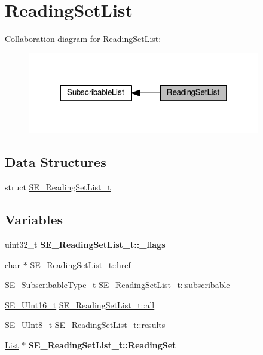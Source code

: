 \hypertarget{group__ReadingSetList}{}\section{Reading\+Set\+List}
\label{group__ReadingSetList}
Collaboration diagram for Reading\+Set\+List\+:\nopagebreak
\begin{figure}[H]
\begin{center}
\leavevmode
\includegraphics[width=288pt]{group__ReadingSetList}
\end{center}
\end{figure}
\subsection*{Data Structures}
\begin{DoxyCompactItemize}
\item 
struct \hyperlink{structSE__ReadingSetList__t}{S\+E\+\_\+\+Reading\+Set\+List\+\_\+t}
\end{DoxyCompactItemize}
\subsection*{Variables}
\begin{DoxyCompactItemize}
\item 
\mbox{\label{group__ReadingSetList_ga70e20e04ac9f65195d9b34a07f8bd1ed}} 
uint32\+\_\+t {\bfseries S\+E\+\_\+\+Reading\+Set\+List\+\_\+t\+::\+\_\+flags}
\item 
char $\ast$ \hyperlink{group__ReadingSetList_ga0070650a5263a076d3ce35b922fc53ea}{S\+E\+\_\+\+Reading\+Set\+List\+\_\+t\+::href}
\item 
\hyperlink{group__SubscribableType_ga5c41f553d369710ed34619266bf2551e}{S\+E\+\_\+\+Subscribable\+Type\+\_\+t} \hyperlink{group__ReadingSetList_ga95a98662b6838987c7eece397b81f7d2}{S\+E\+\_\+\+Reading\+Set\+List\+\_\+t\+::subscribable}
\item 
\hyperlink{group__UInt16_gac68d541f189538bfd30cfaa712d20d29}{S\+E\+\_\+\+U\+Int16\+\_\+t} \hyperlink{group__ReadingSetList_ga1994d11924fcf8fc6a97155fa178c76f}{S\+E\+\_\+\+Reading\+Set\+List\+\_\+t\+::all}
\item 
\hyperlink{group__UInt8_gaf7c365a1acfe204e3a67c16ed44572f5}{S\+E\+\_\+\+U\+Int8\+\_\+t} \hyperlink{group__ReadingSetList_gab43c330676fe1ada7052c94c529d7e29}{S\+E\+\_\+\+Reading\+Set\+List\+\_\+t\+::results}
\item 
\mbox{\label{group__ReadingSetList_ga874aa4e996e3f51a9776fa98c92f9b04}} 
\hyperlink{structList}{List} $\ast$ {\bfseries S\+E\+\_\+\+Reading\+Set\+List\+\_\+t\+::\+Reading\+Set}
\end{DoxyCompactItemize}


